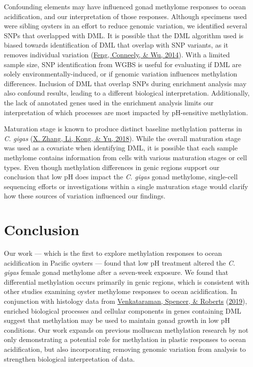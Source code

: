 \documentclass [11pt, proquest] {uwthesis}[2015/03/03]
\begin{document}
Confounding elements may have influenced gonad methylome responses to ocean acidification, and our interpretation of those responses. Although specimens used were sibling oysters in an effort to reduce genomic variation, we identified several SNPs that overlapped with DML. It is possible that the DML algorithm used is biased towards identification of DML that overlap with SNP variants, as it removes individual variation (\protect\hyperlink{ref-Feng2014}{Feng, Conneely, \& Wu, 2014}). With a limited sample size, SNP identification from WGBS is useful for evaluating if DML are solely environmentally-induced, or if genomic variation influences methylation differences. Inclusion of DML that overlap SNPs during enrichment analysis may also confound results, leading to a different biological interpretation. Additionally, the lack of annotated genes used in the enrichment analysis limits our interpretation of which processes are most impacted by pH-sensitive methylation.

Maturation stage is known to produce distinct baseline methylation patterns in \emph{C. gigas} (\protect\hyperlink{ref-Zhang2018}{X. Zhang, Li, Kong, \& Yu, 2018}). While the overall maturation stage was used as a covariate when identifying DML, it is possible that each sample methylome contains information from cells with various maturation stages or cell types. Even though methylation differences in genic regions support our conclusion that low pH does impact the \emph{C. gigas} gonad methylome, single-cell sequencing efforts or investigations within a single maturation stage would clarify how these sources of variation influenced our findings.

\hypertarget{conclusion-2}{%
\section{Conclusion}\label{conclusion-2}}

Our work --- which is the first to explore methylation responses to ocean acidification in Pacific oysters --- found that low pH treatment altered the \emph{C. gigas} female gonad methylome after a seven-week exposure. We found that differential methylation occurs primarily in genic regions, which is consistent with other studies examining oyster methylome responses to ocean acidification. In conjunction with histology data from \protect\hyperlink{ref-Venkataraman2019}{Venkataraman, Spencer, \& Roberts} (\protect\hyperlink{ref-Venkataraman2019}{2019}), enriched biological processes and cellular components in genes containing DML suggest that methylation may be used to maintain gonad growth in low pH conditions. Our work expands on previous molluscan methylation research by not only demonstrating a potential role for methylation in plastic responses to ocean acidification, but also incorporating removing genomic variation from analysis to strengthen biological interpretation of data.
\end{document}
